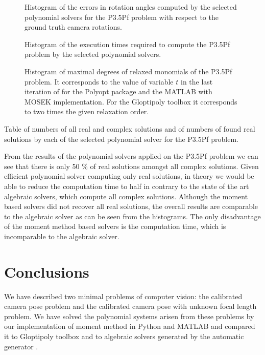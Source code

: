 \begin{figure}[ht]
  \centering
  \resizebox{0.95\textwidth}{!}{}
  \caption{Histogram of the errors in rotation angles computed by the selected polynomial solvers for the P3.5Pf problem with respect to the ground truth camera rotations.}
\end{figure}

\begin{figure}[ht]
  \centering
  \resizebox{0.95\textwidth}{!}{}
  \caption{Histogram of the execution times required to compute the P3.5Pf problem by the selected polynomial solvers.}
\end{figure}

\begin{figure}[ht]
  \centering
  \resizebox{0.95\textwidth}{!}{}
  \caption{Histogram of maximal degrees of relaxed monomials of the P3.5Pf problem. It corresponds to the value of variable $t$ in the last iteration of  for the Polyopt package and the MATLAB with MOSEK implementation. For the Gloptipoly toolbox it corresponds to two times the given relaxation order.}
\end{figure}

\begin{table}[ht]
  \centering
  
  \caption{Table of numbers of all real and complex solutions and of numbers of found real solutions by each of the selected polynomial solver for the P3.5Pf problem.}
\end{table}

From the results of the polynomial solvers applied on the P3.5Pf problem we can see that there is only 50 \% of real solutions amongst all complex solutions.
Given efficient polynomial solver computing only real solutions, in theory we would be able to reduce the computation time to half in contrary to the state of the art algebraic solvers, which compute all complex solutions.
Although the moment based solvers did not recover all real solutions, the overall results are comparable to the algebraic solver as can be seen from the histograms.
The only disadvantage of the moment method based solvers is the computation time, which is incomparable to the algebraic solver.

\section{Conclusions}
We have described two minimal problems of computer vision: the calibrated camera pose problem and the calibrated camera pose with unknown focal length problem.
We have solved the polynomial systems arisen from these problems by our implementation of moment method in Python and MATLAB and compared it to Gloptipoly \cite{gloptipoly} toolbox and to algebraic solvers generated by the automatic generator \cite{autogen}.

